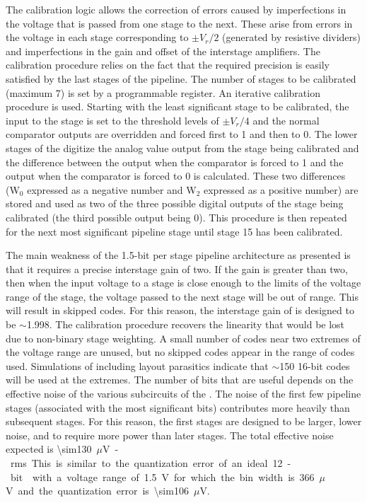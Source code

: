 The calibration logic allows the correction of errors caused by imperfections
in the voltage that is passed from one stage to the next.  These arise from
errors in the voltage in each stage corresponding to $\pm V_r/2$
(generated by resistive dividers) and imperfections in the gain and offset of
the interstage amplifiers.  The calibration procedure relies on the fact that
the required precision is easily satisfied by the last stages of the pipeline.
The number of stages to be calibrated (maximum \num{7}) is set by a programmable
register.  An iterative calibration procedure is used.  Starting with the least
significant stage to be calibrated, the input to the stage is set to the threshold
levels of $\pm V_r/4$ and the normal comparator outputs are overridden
and forced first to \num{1} and then to \num{0}.  The lower stages of the  digitize
the analog value output from the stage being calibrated and the difference between
the  output when the comparator is forced to \num{1} and the 
output when the comparator is forced to \num{0} is calculated.  These two differences
(W$_0$ expressed as a negative number and W$_2$ expressed as a positive number) are
stored and used as two of the three possible digital outputs of the stage being
calibrated (the third possible output being \num{0}).  This procedure is then repeated
for the next most significant pipeline stage until stage \num{15} has been calibrated.

The main weakness of the \num{1.5}-bit per stage pipeline architecture as presented
is that it requires a precise interstage gain of two.  If the gain is greater
than two, then when the input voltage to a stage is close enough to the limits
of the voltage range of the stage, the voltage passed to the next stage will be
out of range.  This will result in skipped  codes.  For this reason,
the interstage gain of  is designed to be $\sim$\num{1.998}.  The
calibration procedure recovers the linearity that would be lost due to
non-binary stage weighting.  A small number of  codes near two
extremes of the voltage range are unused, but no skipped codes appear in the
range of codes used. Simulations of  including layout parasitics 
indicate that $\sim$\num{150} \num{16}-bit codes will be used at the extremes.
The number of  bits that are useful depends on the effective
noise of the various subcircuits of the .  The noise of the first few
pipeline stages (associated with the most significant bits) contributes more
heavily than subsequent stages.  For this reason, the first stages are designed
to be larger, lower noise, and to require more power than later stages.  The total
effective noise expected is \SI{\sim130}{$\mu$V}-rms.  This is similar to the
quantization error of an ideal \num{12}-bit  with a voltage range of
\SI{1.5}{V} for which the bin width is \SI{366}{$\mu$V} and the quantization
error is \SI{\sim106}{$\mu$V}.

